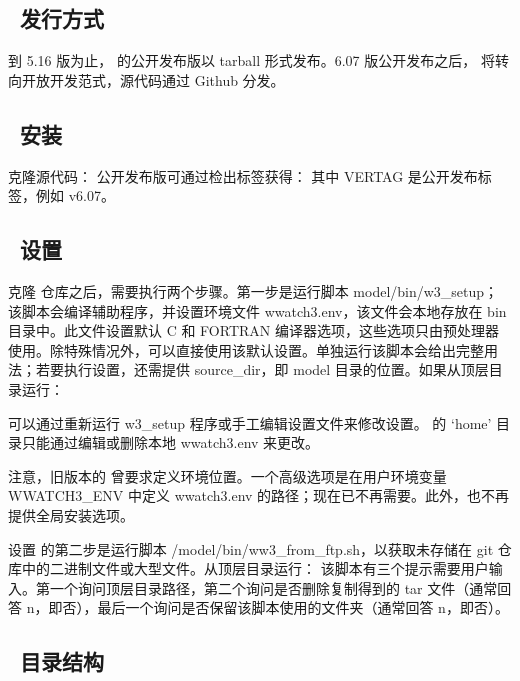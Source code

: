 \vssub
\subsection{~发行方式}\label{sec:install}
\vssub

\noindent 到 5.16 版为止，\ws{} 的公开发布版以 tarball 形式发布。6.07 版公开发布之后，\ws{} 将转向开放开发范式，源代码通过 Github 分发。

\vssub
\subsection{~安装}
\vssub

克隆源代码：
公开发布版可通过检出标签获得：
其中 VERTAG 是公开发布标签，例如 v6.07。

\vssub
\subsection{~设置}
\vssub

克隆 \ws{} 仓库之后，需要执行两个步骤。第一步是运行脚本 {\file model/bin/w3\_setup}；该脚本会编译辅助程序，并设置环境文件 {\file wwatch3.env}，该文件会本地存放在 bin 目录中。此文件设置默认 C 和 FORTRAN 编译器选项，这些选项只由预处理器使用。除特殊情况外，可以直接使用该默认设置。单独运行该脚本会给出完整用法；若要执行设置，还需提供 source\_dir，即 {\file model} 目录的位置。如果从顶层目录运行：

可以通过重新运行 {\file w3\_setup} 程序或手工编辑设置文件来修改设置。\ws{} 的 `home' 目录只能通过编辑或删除本地 {\file wwatch3.env} 来更改。

注意，旧版本的 \ws{} 曾要求定义环境位置。一个高级选项是在用户环境变量 {\code WWATCH3\_ENV} 中定义 {\file wwatch3.env} 的路径；现在已不再需要。此外，也不再提供全局安装选项。

设置 \ws{} 的第二步是运行脚本 {\file /model/bin/ww3\_from\_ftp.sh}，以获取未存储在 git 仓库中的二进制文件或大型文件。从顶层目录运行：
该脚本有三个提示需要用户输入。第一个询问顶层目录路径，第二个询问是否删除复制得到的 tar 文件（通常回答 n，即否），最后一个询问是否保留该脚本使用的文件夹（通常回答 n，即否）。

\vssub
\subsection{~目录结构}
\vssub

